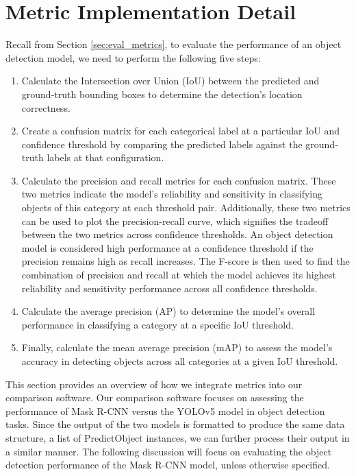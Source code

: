 \section{Metric Implementation Detail}  \label{sec:metric_implement}

Recall from Section \ref{sec:eval_metrics}, to evaluate the performance of an object detection model, we need to perform the following five steps:
\begin{enumerate}
    \item Calculate the Intersection over Union (IoU) between the predicted and ground-truth bounding boxes to determine the detection's location correctness.
    \item Create a confusion matrix for each categorical label at a particular IoU and confidence threshold by comparing the predicted labels against the ground-truth labels at that configuration.
    \item Calculate the precision and recall metrics for each confusion matrix. These two metrics indicate the model's reliability and sensitivity in classifying objects of this category at each threshold pair. Additionally, these two metrics can be used to plot the precision-recall curve, which signifies the tradeoff between the two metrics across confidence thresholds. An object detection model is considered high performance at a confidence threshold if the precision remains high as recall increases. The F-score is then used to find the combination of precision and recall at which the model achieves its highest reliability and sensitivity performance across all confidence thresholds.
    \item Calculate the average precision (AP) to determine the model's overall performance in classifying a category at a specific IoU threshold.
    \item Finally, calculate the mean average precision (mAP) to assess the model's accuracy in detecting objects across all categories at a given IoU threshold.
\end{enumerate}
This section provides an overview of how we integrate metrics into our comparison software. Our comparison software focuses on assessing the performance of Mask R-CNN versus the YOLOv5 model in object detection tasks. Since the output of the two models is formatted to produce the same data structure, a list of PredictObject instances, we can further process their output in a similar manner. The following discussion will focus on evaluating the object detection performance of the Mask R-CNN model, unless otherwise specified. 

